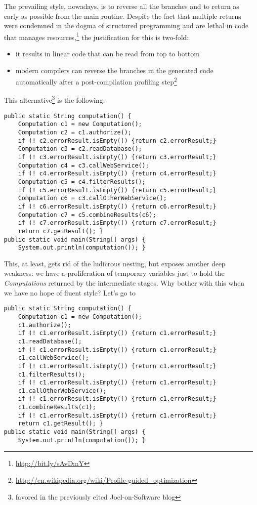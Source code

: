\documentclass[11pt]{article}
\begin{document}
The prevailing style, nowadays, is to reverse all the branches and
to return as early as possible from the main routine. Despite the
fact that multiple returns were condemned in the
dogma of structured programming and are lethal in code that
manages resources,\footnote{\url{http://bit.ly/sAvDmY}} the
justification for this is two-fold:
\begin{itemize}
\item it results in linear code that can be read from top to bottom
\item modern compilers can reverse the branches in the generated code
automatically after a post-compilation profiling
step\footnote{\url{http://en.wikipedia.org/wiki/Profile-guided_optimization}}
\end{itemize}

This alternative\footnote{favored in the previously cited
   Joel-on-Software blog} is the following:

\begin{verbatim}
public static String computation() {
    Computation c1 = new Computation();
    Computation c2 = c1.authorize();
    if (! c2.errorResult.isEmpty()) {return c2.errorResult;}
    Computation c3 = c2.readDatabase();
    if (! c3.errorResult.isEmpty()) {return c3.errorResult;}
    Computation c4 = c3.callWebService();
    if (! c4.errorResult.isEmpty()) {return c4.errorResult;}
    Computation c5 = c4.filterResults();
    if (! c5.errorResult.isEmpty()) {return c5.errorResult;}
    Computation c6 = c3.callOtherWebService();
    if (! c6.errorResult.isEmpty()) {return c6.errorResult;}
    Computation c7 = c5.combineResults(c6);
    if (! c7.errorResult.isEmpty()) {return c7.errorResult;}
    return c7.getResult(); }
public static void main(String[] args) {
    System.out.println(computation()); }
\end{verbatim}

This, at least, gets rid of the ludicrous nesting, but exposes another
deep weakness: we have a proliferation of temporary variables just to
hold the \emph{Computations} returned by the intermediate stages. Why
bother with this when we have no hope of fluent style? Let's go to

\begin{verbatim}
public static String computation() {
    Computation c1 = new Computation();
    c1.authorize();
    if (! c1.errorResult.isEmpty()) {return c1.errorResult;}
    c1.readDatabase();
    if (! c1.errorResult.isEmpty()) {return c1.errorResult;}
    c1.callWebService();
    if (! c1.errorResult.isEmpty()) {return c1.errorResult;}
    c1.filterResults();
    if (! c1.errorResult.isEmpty()) {return c1.errorResult;}
    c1.callOtherWebService();
    if (! c1.errorResult.isEmpty()) {return c1.errorResult;}
    c1.combineResults(c1);
    if (! c1.errorResult.isEmpty()) {return c1.errorResult;}
    return c1.getResult(); }
public static void main(String[] args) {
    System.out.println(computation()); }
\end{verbatim}
\end{document}
